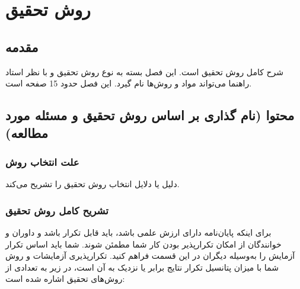\mainchapterstyle
\chapter{روش تحقیق}
\pagestyle{mainheader} 


\section{مقدمه}
شرح کامل روش تحقیق است. این فصل بسته به نوع روش تحقیق و با نظر استاد راهنما می‌تواند مواد و روش‌ها
نام گیرد. این فصل حدود 15 صفحه است.


\section{محتوا (نام گذاری بر اساس روش تحقیق و مسئله مورد مطالعه)}

\subsection{علت انتخاب روش}
دلیل یا دلایل انتخاب روش تحقیق را تشریح می‌کند.

\subsection{تشريح كامل روش تحقیق}
برای اینکه پایان‌نامه دارای ارزش علمی باشد، باید قابل تکرار باشد و داوران و خوانندگان از امکان
تکرارپذیر بودن کار شما مطمئن شوند. شما باید اساس تکرار آزمایش را به‌وسیله دیگران در این قسمت فراهم
کنید. تکرارپذیری آزمایشات و روش شما با میزان پتانسیل تکرار نتایج برابر یا نزدیک به آن است، در زیر به
تعدادی از روش‌های تحقیق اشاره شده است:


